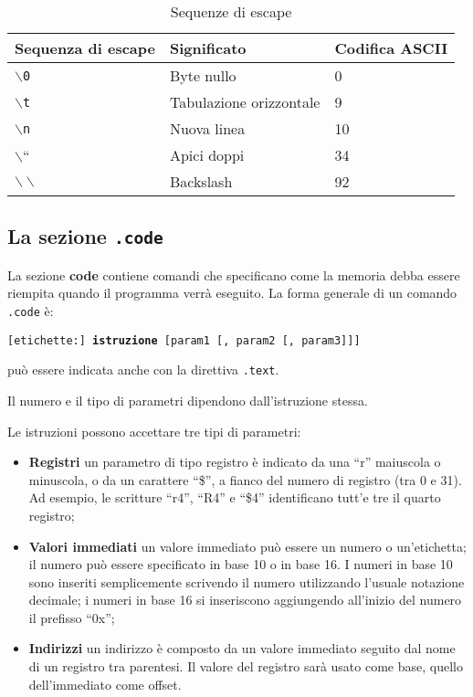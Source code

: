 \documentclass[12pt]{report}
\begin{document}
\begin{table}[!htb]
	\begin{tabular}{lll}
		\hline
		\hline
		Sequenza di escape & Significato & Codifica ASCII\\
		\hline
		\texttt{$\backslash$0} & Byte nullo & 0\\
		\texttt{$\backslash$t} & Tabulazione orizzontale & 9\\
		\texttt{$\backslash$n} & Nuova linea & 10\\
		\texttt{$\backslash$}`` & Apici doppi & 34\\
		\texttt{$\backslash\backslash$} & Backslash & 92
	\end{tabular}
	\caption{Sequenze di escape}
	\label{table:escaping}
\end{table}

\subsection{La sezione \texttt{.code}}
La sezione \textbf{code} contiene comandi che specificano come la memoria debba essere riempita 
quando il programma verr\`{a} eseguito. La forma generale di un comando \texttt{.code} \`{e}:

\begin{center}
	\texttt{[etichette:] \textbf{istruzione} [param1 [, param2 [, param3]]]}
\end{center}

 pu\`{o} essere indicata anche con la direttiva \texttt{.text}.

Il numero e il tipo di parametri dipendono dall'istruzione stessa. 

Le istruzioni possono accettare tre tipi di parametri:
\begin{itemize}
	\item \textbf{Registri} un parametro di tipo registro \`e indicato da una
    ``r'' maiuscola o minuscola, o da un carattere ``\$'', a fianco del numero
    di registro (tra 0 e 31). Ad esempio, le scritture ``r4'', ``R4'' e ``\$4''
    identificano tutt'e tre il quarto registro;
	\item \textbf{Valori immediati} un valore immediato pu\`o essere un numero o
    un'etichetta; il numero pu\`o essere specificato in base 10 o in base 16. I
    numeri in base 10 sono inseriti semplicemente scrivendo il numero
    utilizzando l'usuale notazione decimale; i numeri in base 16 si inseriscono
    aggiungendo all'inizio del numero il prefisso ``0x'';
    \item \textbf{Indirizzi} un indirizzo \`e composto da un valore immediato
    seguito dal nome di un registro tra parentesi. Il valore del registro sar\`a
    usato come base, quello dell'immediato come offset.
\end{itemize}
\end{document}
